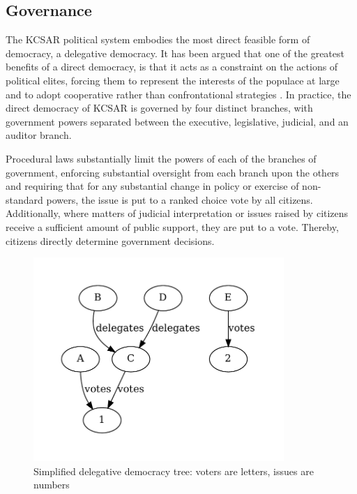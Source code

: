 \documentclass[fleqn,10pt]{Stylesheet} %
\begin{document}
\subsection{Governance}

The KCSAR political system embodies the most direct feasible form of democracy, a delegative democracy. It has been argued that one of the greatest benefits of a direct democracy, is that it acts as a constraint on the actions of political elites, forcing them to represent the interests of the populace at large and to adopt cooperative rather than confrontational strategies \cite{Papadopoulos2001}. In practice, the direct democracy of KCSAR is governed by four distinct branches, with government powers separated between the executive, legislative, judicial, and an auditor branch.

Procedural laws substantially limit the powers of each of the branches of government, enforcing substantial oversight from each branch upon the others and requiring that for any substantial change in policy or exercise of non-standard powers, the issue is put to a ranked choice vote by all citizens. Additionally, where matters of judicial interpretation or issues raised by citizens receive a sufficient amount of public support, they are put to a vote. Thereby, citizens directly determine government decisions.

\begin{figure}
    \centering
    \includegraphics[width=95mm]{figures/fig_del_democracy.pdf}
    \caption{Simplified delegative democracy tree: voters are letters, issues are numbers}
\end{figure}
\end{document}

